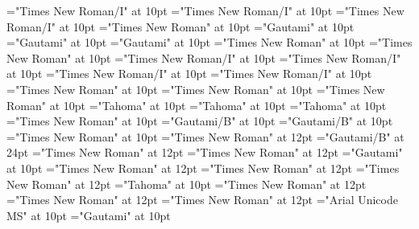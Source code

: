 \documentclass[c5paper,twoside]{article}
\begin{document}
\font\spanenpartofspeechengrammaticalinfoentryletDatadicBody="Times New Roman/I" at 10pt
\font\partofspeechengrammaticalinfoentryletDatadicBody="Times New Roman/I" at 10pt
\font\grammaticalinfoentryletDatadicBody="Times New Roman/I" at 10pt
\font\spanensensesentryletDatadicBody="Times New Roman" at 10pt
\font\spanenLexSensepublishStemGlossPubLdtesensesensesentryletDatadicBody="Gautami" at 10pt
\font\spanteLexSensepublishStemGlossPubLdtesensesensesentryletDatadicBody="Gautami" at 10pt
\font\LexSensepublishStemGlossPubLdtesensesensesentryletDatadicBody="Gautami" at 10pt
\font\spanendefinitionensensesensesentryletDatadicBody="Times New Roman" at 10pt
\font{}="Times New Roman" at 10pt
\font\spanengrammaticalinfosensesensesentryletDatadicBody="Times New Roman/I" at 10pt
\font\spanenpartofspeechengrammaticalinfosensesensesentryletDatadicBody="Times New Roman/I" at 10pt
\font\partofspeechengrammaticalinfosensesensesentryletDatadicBody="Times New Roman/I" at 10pt
\font\grammaticalinfosensesensesentryletDatadicBody="Times New Roman/I" at 10pt
\font\sensesensesentryletDatadicBody="Times New Roman" at 10pt
\font\sensesentryletDatadicBody="Times New Roman" at 10pt
\font\spanenpronunciationsentryletDatadicBody="Times New Roman" at 10pt
\font\spanggofonipaxemicpronunciationggofonipaxemicpronunciationsentryletDatadicBody="Tahoma" at 10pt
\font\spanenpronunciationggofonipaxemicpronunciationsentryletDatadicBody="Tahoma" at 10pt
\font\pronunciationggofonipaxemicpronunciationsentryletDatadicBody="Tahoma" at 10pt
\font\pronunciationsentryletDatadicBody="Times New Roman" at 10pt
\font\spanenheadwordggoTeluINentryletDatadicBody="Gautami/B" at 10pt
\font\headwordggoTeluINentryletDatadicBody="Gautami/B" at 10pt
\font\entryletDatadicBody="Times New Roman" at 10pt
\font{}="Times New Roman" at 12pt
\font{}="Gautami/B" at 24pt
\font{}="Times New Roman" at 12pt
\font\xitemtpi="Times New Roman" at 12pt
\font\xitemxitemtranslationLdbefore="Gautami" at 10pt
\font\xitemxitemtranslationbefore="Times New Roman" at 12pt
\font\sensesensesensesbefore="Times New Roman" at 12pt
\font\xitemxitempronunciationsbefore="Times New Roman" at 12pt
\font\xitemxitempronunciationbefore="Tahoma" at 10pt
\font\xitemxitemprimaryrefsbefore="Times New Roman" at 12pt
\font\xitemxitempictureLabelbefore="Times New Roman" at 12pt
\font\xitemxitempartofspeechbefore="Times New Roman" at 12pt
\font\xitemxitemLexSensepublishStemGlossPubLebefore="Arial Unicode MS" at 10pt
\font\xitemxitemLexSensepublishStemGlossPubLdbefore="Gautami" at 10pt
\end{document}

